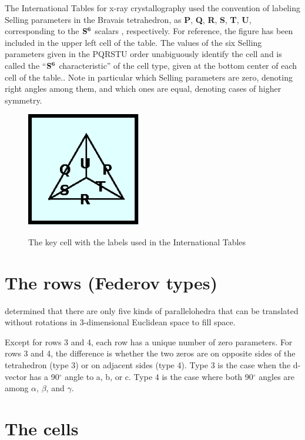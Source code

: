 \documentclass[preprint]{iucr}              %
\numberwithin{equation}{section}
\newcommand{\SVI}[0]{$\bf{S^{6}}$}
\begin{document}
The International Tables for x-ray crystallography \cite{vonLaue1952}
used the convention of labeling Selling parameters in the Bravais
tetrahedron, as \textbf{P}, \textbf{Q}, \textbf{R}, \textbf{S}, \textbf{T}, \textbf{U}, corresponding to the \SVI{} scalars
\Svec, respectively. For reference,
the figure has been included in the upper left cell of the table.  The values of the six
Selling parameters given in the PQRSTU order unabiguously identify the cell and is called
the ``\SVI{} characteristic'' of the cell type, given at the bottom center of each cell of
the table..  Note in particular which Selling
parameters are zero, denoting right angles among them, and which ones are equal,
denoting cases of higher symmetry.
	\begin{figure}
		\includegraphics[width=5cm]{PQRSTU}
		\label{PQRSTU}
		\caption{The key cell with the labels used in the
		International Tables}
	\end{figure}
	
\section{The rows (Federov types)}
	
	 determined that there are only
	five kinds of parallelohedra that can be translated without rotations in 3-dimensional Euclidean space to fill space. 
	
	Except for rows 3 and 4, each row has a unique number of zero
	parameters. For rows 3 and 4, the difference is whether the two
	zeros are on opposite sides of the tetrahedron (type 3) or on 
	adjacent sides (type 4). Type 3 is the case when the d-vector has
	a 90$^{\circ}$ angle to a, b, or c. Type 4 is the case
	where both 90$^{\circ}$ angles are among $\alpha$, $\beta$,
	and $\gamma$.
	
\section{The cells}
	
\end{document}
